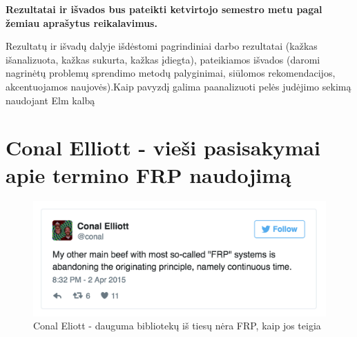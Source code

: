 \documentclass{VUMIFPSmagistrinis}
\begin{document}

\textbf{Rezultatai ir išvados bus pateikti ketvirtojo semestro metu pagal žemiau aprašytus reikalavimus.}

Rezultatų ir išvadų dalyje išdėstomi pagrindiniai darbo rezultatai (kažkas
išanalizuota, kažkas sukurta, kažkas įdiegta), pateikiamos išvados (daromi
nagrinėtų problemų sprendimo metodų palyginimai, siūlomos rekomendacijos,
akcentuojamos naujovės).Kaip pavyzdį galima paanalizuoti pelės judėjimo sekimą naudojant Elm kalbą

\printbibliography[heading=bibintoc]  %





\appendix  %

\section{Conal Elliott - vieši pasisakymai apie termino FRP naudojimą}

\begin{figure}[H]
    \centering
    \includegraphics[scale=0.5]{img/not_frp1}
    \caption{Conal Eliott - dauguma bibliotekų iš tiesų nėra FRP, kaip jos teigia}
    \label{img:not_frp1}
\end{figure}
\end{document}
